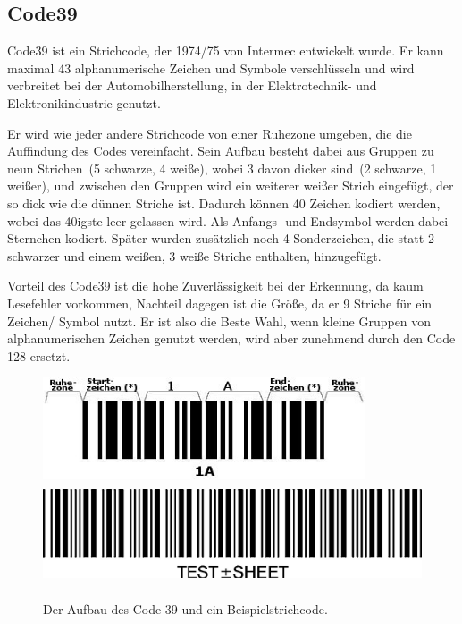 \subsection*{Code39}
Code39 ist ein Strichcode, der 1974/75 von Intermec entwickelt wurde. Er kann max\-imal 43 alphanumerische Zeichen und Symbole verschlüsseln und wird verbreitet bei der Automobilherstellung, in der Elektrotechnik- und Elektronikindustrie genutzt.

Er wird wie jeder andere Strichcode von einer Ruhezone umgeben, die die Auffindung des Codes vereinfacht. Sein Aufbau besteht dabei aus Gruppen zu neun Strichen~(5 schwarze, 4 weiße), wobei 3 davon dicker sind~(2 schwarze, 1 weißer), und zwischen den Gruppen wird ein weiterer weißer Strich eingefügt, der so dick wie die dünnen Striche ist. Dadurch können 40 Zeichen kodiert werden, wobei das 40igste leer gelassen wird. Als Anfangs- und Endsymbol werden dabei Sternchen kodiert. Später wurden zusätzlich noch 4 Sonderzeichen, die statt 2 schwarzer und einem weißen, 3 weiße Striche enthalten, hinzugefügt.

Vorteil des Code39 ist die hohe Zuverlässigkeit bei der Erkennung, da kaum Lesefehler vorkommen, Nachteil dagegen ist die Größe, da er 9 Striche für ein Zeichen/ Symbol nutzt. Er ist also die Beste Wahl, wenn kleine Gruppen von alphanumerischen Zeichen genutzt werden, wird aber zunehmend durch den Code 128 ersetzt.

\begin{figure}[H]
  \centering
  \includegraphics[height=3cm]{img/EAN13/code39-structure.jpg}
  \includegraphics[height=3cm]{img/EAN13/code39.jpg}
  \caption{Der Aufbau des Code 39 und ein Beispielstrichcode.}
  \label{fig:code39}
\end{figure}

